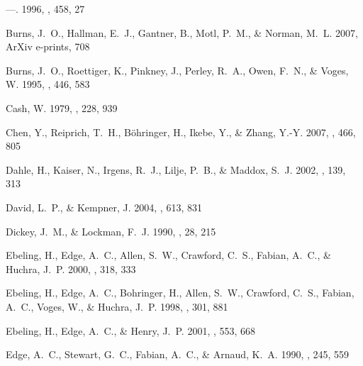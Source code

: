 \documentclass[12pt,preprint]{aastex}
\begin{document}
\begin{thebibliography}{}
---. 1996, \apj, 458, 27

{Burns}, J.~O., {Hallman}, E.~J., {Gantner}, B., {Motl}, P.~M., \& {Norman},
  M.~L. 2007, ArXiv e-prints, 708

{Burns}, J.~O., {Roettiger}, K., {Pinkney}, J., {Perley}, R.~A., {Owen}, F.~N.,
  \& {Voges}, W. 1995, \apj, 446, 583

{Cash}, W. 1979, \apj, 228, 939

{Chen}, Y., {Reiprich}, T.~H., {B{\"o}hringer}, H., {Ikebe}, Y., \& {Zhang},
  Y.-Y. 2007, \aap, 466, 805

{Dahle}, H., {Kaiser}, N., {Irgens}, R.~J., {Lilje}, P.~B., \& {Maddox}, S.~J.
  2002, \apjs, 139, 313

{David}, L.~P., \& {Kempner}, J. 2004, \apj, 613, 831

{Dickey}, J.~M., \& {Lockman}, F.~J. 1990, \araa, 28, 215

{Ebeling}, H., {Edge}, A.~C., {Allen}, S.~W., {Crawford}, C.~S., {Fabian},
  A.~C., \& {Huchra}, J.~P. 2000, \mnras, 318, 333

{Ebeling}, H., {Edge}, A.~C., {Bohringer}, H., {Allen}, S.~W., {Crawford},
  C.~S., {Fabian}, A.~C., {Voges}, W., \& {Huchra}, J.~P. 1998, \mnras, 301,
  881

{Ebeling}, H., {Edge}, A.~C., \& {Henry}, J.~P. 2001, \apj, 553, 668

{Edge}, A.~C., {Stewart}, G.~C., {Fabian}, A.~C., \& {Arnaud}, K.~A. 1990,
  \mnras, 245, 559


\end{thebibliography}
\end{document}
